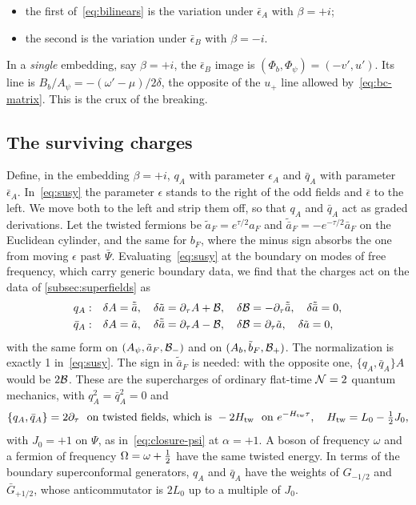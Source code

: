 \begin{itemize}
\item the first of~\eqref{eq:bilinears} is the variation under $\bar\epsilon_A$ with $\beta=+i$;
\item the second is the variation under $\bar\epsilon_B$ with $\beta=-i$.
\end{itemize}
In a \emph{single} embedding, say $\beta=+i$, the $\bar\epsilon_B$ image is $(\Phi_b,\Phi_\psi)=(-v',u')$. Its line is $B_b/A_\psi=-(\omega'-\mu)/2\delta$, the opposite of the $u_+$ line allowed by~\eqref{eq:bc-matrix}. This is the crux of the breaking.

\subsection{The surviving charges}
\label{subsec:surviving}

Define, in the embedding $\beta=+i$, $q_A$ with parameter $\epsilon_A$ and $\bar q_A$ with parameter $\bar\epsilon_A$. In~\eqref{eq:susy} the parameter $\epsilon$ stands to the right of the odd fields and $\bar\epsilon$ to the left. We move both to the left and strip them off, so that $q_A$ and $\bar q_A$ act as graded derivations. Let the twisted fermions be $\tilde a_F=e^{\tau/2}a_F$ and $\tilde{\bar a}_F=-e^{-\tau/2}\bar a_F$ on the Euclidean cylinder, and the same for $b_F$, where the minus sign absorbs the one from moving $\epsilon$ past $\bar\Psi$. Evaluating~\eqref{eq:susy} at the boundary on modes of free frequency, which carry generic boundary data, we find that the charges act on the data of \cref{subsec:superfields} as
\begin{equation}\label{eq:boundary-susy}
\begin{aligned}
q_A:&\quad\delta A=\tilde{\bar a},\quad\delta\tilde a=\partial_\tau A+\mathcal{B},\quad\delta\mathcal{B}=-\partial_\tau\tilde{\bar a},\quad\delta\tilde{\bar a}=0,\\
\bar q_A:&\quad\delta A=\tilde a,\quad\delta\tilde{\bar a}=\partial_\tau A-\mathcal{B},\quad\delta\mathcal{B}=\partial_\tau\tilde a,\quad\delta\tilde a=0,
\end{aligned}
\end{equation}
with the same form on $(A_\psi,\tilde a_F,\mathcal{B}_-)$ and on $(A_b,\tilde b_F,\mathcal{B}_+)$. The normalization is exactly 1 in~\eqref{eq:susy}. The sign in $\tilde{\bar a}_F$ is needed: with the opposite one, $\{q_A,\bar q_A\}A$ would be $2\mathcal{B}$. These are the supercharges of ordinary flat-time $\mathcal{N}=2$ quantum mechanics, with $q_A^2=\bar q_A^2=0$ and
\begin{equation}\label{eq:twisted}
\{q_A,\bar q_A\}=2\partial_\tau\ \text{ on twisted fields, which is }-2H_{\rm tw}\ \text{ on }e^{-H_{\rm tw}\tau},\quad H_{\rm tw}=L_0-\tfrac12 J_0,
\end{equation}
with $J_0=+1$ on $\Psi$, as in~\eqref{eq:closure-psi} at $\alpha=+1$. A boson of frequency $\omega$ and a fermion of frequency $\Omega=\omega+\tfrac12$ have the same twisted energy. In terms of the boundary superconformal generators, $q_A$ and $\bar q_A$ have the weights of $G_{-1/2}$ and $\bar G_{+1/2}$, whose anticommutator is $2L_0$ up to a multiple of $J_0$.

